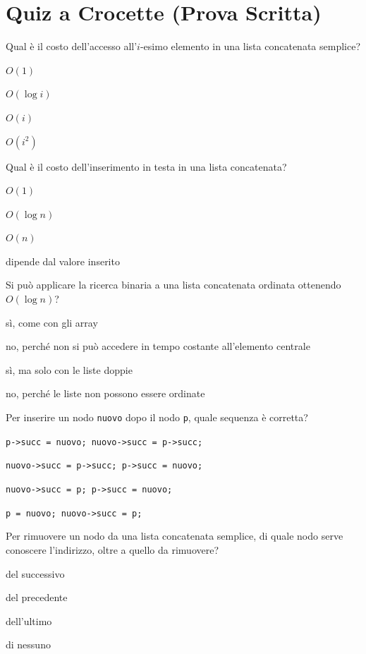 \section{Quiz a Crocette (Prova Scritta)}

\begin{quiz}{Qual è il costo dell'accesso all'$i$-esimo elemento in una lista concatenata semplice?}
  \item $O(1)$
  \item $O(\log i)$
  \item $O(i)$
  \item $O(i^2)$
\end{quiz}

\begin{quiz}{Qual è il costo dell'inserimento in testa in una lista concatenata?}
  \item $O(1)$
  \item $O(\log n)$
  \item $O(n)$
  \item dipende dal valore inserito
\end{quiz}

\begin{quiz}{Si può applicare la ricerca binaria a una lista concatenata ordinata ottenendo $O(\log n)$?}
  \item sì, come con gli array
  \item no, perché non si può accedere in tempo costante all'elemento centrale
  \item sì, ma solo con le liste doppie
  \item no, perché le liste non possono essere ordinate
\end{quiz}

\begin{quiz}{Per inserire un nodo \texttt{nuovo} dopo il nodo \texttt{p}, quale sequenza è corretta?}
  \item \texttt{p->succ = nuovo; nuovo->succ = p->succ;}
  \item \texttt{nuovo->succ = p->succ; p->succ = nuovo;}
  \item \texttt{nuovo->succ = p; p->succ = nuovo;}
  \item \texttt{p = nuovo; nuovo->succ = p;}
\end{quiz}

\begin{quiz}{Per rimuovere un nodo da una lista concatenata semplice, di quale nodo serve conoscere l'indirizzo, oltre a quello da rimuovere?}
  \item del successivo
  \item del precedente
  \item dell'ultimo
  \item di nessuno
\end{quiz}

